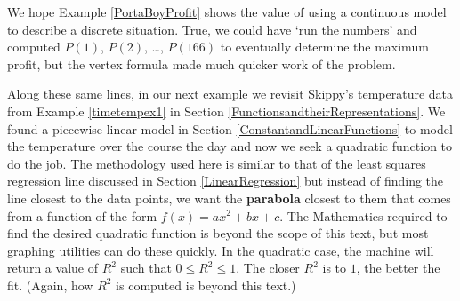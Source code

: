 We hope Example \ref{PortaBoyProfit}  shows the value of using a continuous model to describe a discrete situation.  True, we could have `run the numbers' and computed $P(1)$, $P(2)$, \ldots,  $P(166)$ to eventually determine the maximum profit, but the vertex formula made much quicker work of the problem.  

\medskip

Along these same lines, in our next example we revisit Skippy's temperature data from Example \ref{timetempex1} in Section \ref{FunctionsandtheirRepresentations}.  We found a piecewise-linear model in Section \ref{ConstantandLinearFunctions} to model the temperature over the course the day and now we seek a quadratic function to do the job.  The methodology used here is similar to that of the least squares regression line discussed in Section \ref{LinearRegression} but instead of finding the line closest to the data points, we want the \textbf{parabola} closest to them that comes from a function of the form $f(x) = ax^{2} + bx + c$.  The Mathematics required to find the desired quadratic function is beyond the scope of this text, but most graphing utilities can do these quickly.  In the quadratic case, the machine will return a value of $R^{2}$ such that $0 \leq R^{2} \leq 1$.  The closer $R^{2}$ is to $1$, the better the fit.  (Again, how $R^{2}$ is computed is beyond this text.)

